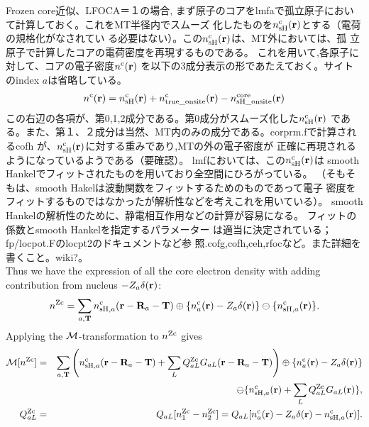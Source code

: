 \documentclass[a4paper,10pt,aip,onecolumn,amsmath,amssymb,floatfix,rmp]{revtex4-1}
\newcommand{\bfr}{{\bf r}}
\newcommand{\bfT}{{\bf T}}
\newcommand{\bfR}{{\bf R}}
\newcommand{\ooplus}{\oplus}
\newcommand{\oominus}{\ominus}
\def\nc{n^{\rm c}}
\def\nzc{n^{\rm Zc}}
\def\MM{{\cal M}}
\begin{document}
\begin{widetext}
\begin{widetext}
Frozen core近似、LFOCA＝１の場合,
まず原子のコアをlmfaで孤立原子において計算しておく。これをMT半径内でスムーズ
化したものを$n^{\rm c}_{\rm sH}(\bfr)$とする（電荷の規格化がなされてい
る必要はない）。この$n^{\rm c}_{\rm sH}(\bfr)$は、MT外においては、孤
立原子で計算したコアの電荷密度を再現するものである。
これを用いて,各原子に対して、コアの電子密度$n^{\rm c}(\bfr)$
を以下の3成分表示の形であたえておく。サイトのindex $a$は省略している。
\begin{eqnarray}
n^{\rm c}(\bfr)= 
n^{\rm c}_{\rm sH}(\bfr)
+ n^{\rm c}_{\rm true\_onsite}(\bfr)- n^{\rm core}_{\rm
sH\_onsite}(\bfr)
\label{eq:nc}
\end{eqnarray}
この右辺の各項が、第0,1,2成分である。第0成分がスムーズ化した$n^{\rm c}_{\rm sH}(\bfr)$
である。また、第１、２成分は当然、MT内のみの成分である。corprm.fで計算されるcofh
が、$n^{\rm c}_{\rm sH}(\bfr)$に対する重みであり,MTの外の電子密度が
正確に再現されるようになっているようである（要確認）。
lmfにおいては、この$n^{\rm c}_{\rm sH}(\bfr)$は
smooth Hankelでフィットされたものを用いており全空間にひろがっている。
（そもそもは、smooth Hakelは波動関数をフィットするためのものであって電子
密度をフィットするものではなかったが解析性などを考えこれを用いている）。
smooth Hankelの解析性のために、静電相互作用などの計算が容易になる。
フィットの係数とsmooth Hankelを指定するパラメーター
は適当に決定されている；fp/locpot.Fのlocpt2のドキュメントなど参
照.cofg,cofh,ceh,rfocなど。また詳細を書くこと。wiki?。\\
  
Thus we have the expression of all the core electron density with adding
contribution from nucleus $-Z_a\delta(\bfr)$:
\begin{eqnarray}
\nzc = \sum_{a,\bfT} \nc_{{\rm sH},a}(\bfr-\bfR_a-\bfT) \ooplus
\{\nc_{a}(\bfr)-Z_a\delta(\bfr) \} \oominus \{\nc_{{\rm sH},a}(\bfr) \}.
\label{eq:nzc}
\end{eqnarray}
Applying the $\MM$-transformation to $\nzc$ gives
\begin{eqnarray}
\MM[\nzc]
&=& \sum_{a,\bfT} 
\left( \nc_{{\rm sH},a}(\bfr-\bfR_a-\bfT)+\sum_L Q_{aL}^{\rm Zc} G_{aL}(\bfr-\bfR_a-\bfT) \right)\ooplus
\{\nc_{a}(\bfr)-Z_a\delta(\bfr)\} \nonumber \\
&& \oominus \{ \nc_{{\rm sH},a}(\bfr)+\sum_L Q_{aL}^{\rm Zc}G_{aL}(\bfr)\},\label{eq:nc} \\
Q^{\rm Zc}_{aL} &=& Q_{aL}[\nzc_1-\nzc_2] =
Q_{aL}[\nc_{a}(\bfr)-Z_a\delta(\bfr)-\nc_{{\rm sH},a}(\bfr)] \label{eq:qalnzc}.
\end{eqnarray}


\end{widetext}
\end{widetext}
\end{document}
